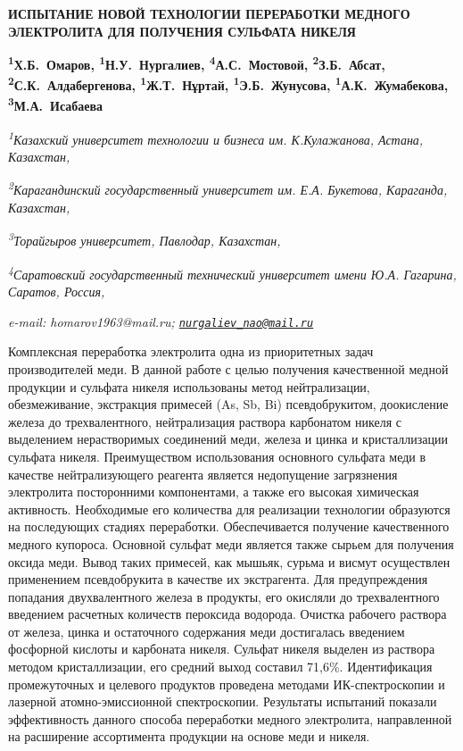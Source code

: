 \begin{articleheader}
{\bfseries ИСПЫТАНИЕ НОВОЙ ТЕХНОЛОГИИ ПЕРЕРАБОТКИ МЕДНОГО ЭЛЕКТРОЛИТА ДЛЯ ПОЛУЧЕНИЯ СУЛЬФАТА НИКЕЛЯ}

{\bfseries
\textsuperscript{1}Х.Б.~Омаров\textsuperscript{\envelope },
\textsuperscript{1}Н.У.~Нургалиев\textsuperscript{\envelope },
\textsuperscript{4}А.С.~Мостовой,
\textsuperscript{2}З.Б.~Абсат,
\textsuperscript{2}С.К.~Алдабергенова,
\textsuperscript{1}Ж.Т.~Нұртай,
\textsuperscript{1}Э.Б.~Жунусова,
\textsuperscript{1}А.К.~Жумабекова,
\textsuperscript{3}М.А.~Исабаева}
\end{articleheader}

\begin{affiliation}
\emph{\textsuperscript{1}Казахский университет технологии и бизнеса им. К.Кулажанова, Астана, Казахстан,}

\emph{\textsuperscript{2}Карагандинский государственный университет им. Е.А. Букетова, Караганда, Казахстан,}

\emph{\textsuperscript{3}Торайгыров университет, Павлодар, Казахстан,}

\emph{\textsuperscript{4}Саратовский государственный технический университет имени Ю.А. Гагарина, Саратов, Россия,}

\emph{e-mail: homarov1963@mail.ru; \href{mailto:nurgaliev_nao@mail.ru}{\nolinkurl{nurgaliev\_nao@mail.ru}}}
\end{affiliation}

Комплексная переработка электролита одна из приоритетных задач
производителей меди. В данной работе с целью получения качественной
медной продукции и сульфата никеля использованы метод нейтрализации,
обезмеживание, экстракция примесей (As, Sb, Bi) псевдобрукитом,
доокисление железа до трехвалентного, нейтрализация раствора карбонатом
никеля с выделением нерастворимых соединений меди, железа и цинка и
кристаллизации сульфата никеля. Преимуществом использования основного
сульфата меди в качестве нейтрализующего реагента является недопущение
загрязнения электролита посторонними компонентами, а также его высокая
химическая активность. Необходимые его количества для реализации
технологии образуются на последующих стадиях переработки. Обеспечивается
получение качественного медного купороса. Основной сульфат меди является
также сырьем для получения оксида меди. Вывод таких примесей, как
мышьяк, сурьма и висмут осуществлен применением псевдобрукита в качестве
их экстрагента. Для предупреждения попадания двухвалентного железа в
продукты, его окисляли до трехвалентного введением расчетных количеств
пероксида водорода. Очистка рабочего раствора от железа, цинка и
остаточного содержания меди достигалась введением фосфорной кислоты и
карбоната никеля. Сульфат никеля выделен из раствора методом
кристаллизации, его средний выход составил 71,6\%. Идентификация
промежуточных и целевого продуктов проведена методами ИК-спектроскопии и
лазерной атомно-эмиссионной спектроскопии. Результаты испытаний показали
эффективность данного способа переработки медного электролита,
направленной на расширение ассортимента продукции на основе меди и
никеля.

